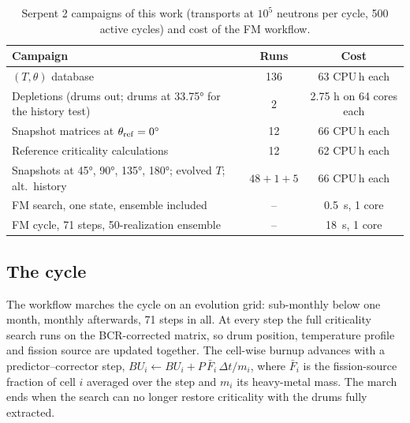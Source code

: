 \documentclass[]{ANStopical}
\begin{document}
\begin{table}[tb]
    \centering
    \caption{Serpent 2 campaigns of this work (transports at $10^5$ neutrons per cycle, 500 active cycles) and cost of the FM workflow.}
    \label{tab:cost}
    \begin{tabular}{lcc}
        \toprule
        \textbf{Campaign} & \textbf{Runs} & \textbf{Cost} \\
        \midrule
        $(T,\theta)$ database \cite{vita2026fm} & 136 & 63 CPU\,h each \\
        Depletions (drums out; drums at \ang{33.75} for the history test) & 2 & 2.75 h on 64 cores each \\
        Snapshot matrices at $\theta_{\rm ref}=\ang{0}$ & 12 & 66 CPU\,h each \\
        Reference criticality calculations & 12 & 62 CPU\,h each \\
        Snapshots at \ang{45}, \ang{90}, \ang{135}, \ang{180}; evolved $T$; alt.\ history & $48+1+5$ & 66 CPU\,h each \\
        \midrule
        FM search, one state, ensemble included & -- & \SI{0.5}{s}, 1 core \\
        FM cycle, 71 steps, 50-realization ensemble & -- & \SI{18}{s}, 1 core \\
        \bottomrule
    \end{tabular}
\end{table}

\subsection{The cycle}

The workflow marches the cycle on an evolution grid: sub-monthly below one month, monthly afterwards, 71 steps in all. At every step the full criticality search runs on the BCR-corrected matrix, so drum position, temperature profile and fission source are updated together. The cell-wise burnup advances with a predictor--corrector step, $BU_i \leftarrow BU_i + P\,\bar F_i\,\Delta t/m_i$, where $\bar F_i$ is the fission-source fraction of cell $i$ averaged over the step and $m_i$ its heavy-metal mass. The march ends when the search can no longer restore criticality with the drums fully extracted.
\end{document}
